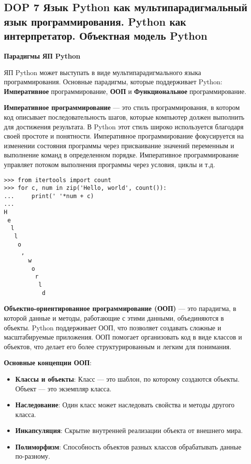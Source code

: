 \subsection{DOP 7 Язык Python как мультипарадигмальный язык программирования. Python как интерпретатор. Объектная модель Python}


\textbf{Парадигмы ЯП Python}

ЯП Python может выступать в виде мультипарадигмального языка программирования. Основные парадигмы, которые поддерживает Python: \textbf{Императивное} программирование, \textbf{ООП} и \textbf{Функциональное} программирование.

\textbf{Императивное программирование} — это стиль программирования, в котором код описывает последовательность шагов, которые компьютер должен выполнить для достижения результата. В Python этот стиль широко используется благодаря своей простоте и понятности. Императивное программирование фокусируется на изменении состояния программы через присваивание значений переменным и выполнение команд в определенном порядке. Императивное программирование управляет потоком выполнения программы через условия, циклы и т.д.

\begin{verbatim}
>>> from itertools import count
>>> for c, num in zip('Hello, world', count()):
...     print(' '*num + c)
...
H
 e
  l
   l
    o
     ,
       w
        o
         r
          l
           d
\end{verbatim}

\textbf{Объектно-ориентированное программирование (ООП)} — это парадигма, в которой данные и методы, работающие с этими данными, объединяются в объекты. Python поддерживает ООП, что позволяет создавать сложные и масштабируемые приложения. ООП помогает организовать код в виде классов и объектов, что делает его более структурированным и легким для понимания.

\textbf{Основные концепции ООП}:
\begin{itemize}
    \item \textbf{Классы и объекты}: Класс — это шаблон, по которому создаются объекты. Объект — это экземпляр класса.
    \item \textbf{Наследование}: Один класс может наследовать свойства и методы другого класса.
    \item \textbf{Инкапсуляция}: Скрытие внутренней реализации объекта от внешнего мира.
    \item \textbf{Полиморфизм}: Способность объектов разных классов обрабатывать данные по-разному.
\end{itemize}

